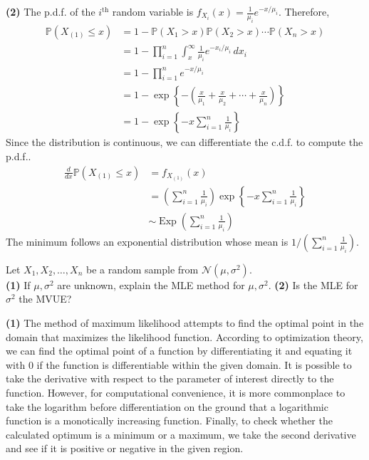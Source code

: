 \documentclass[answers]{exam}
\newcommand{\opn}{\operatorname}
\begin{document}
\begin{questions}
\begin{solution}
   \textbf{(2)} The p.d.f. of the $i^{\text{th}}$ random variable is $f_{X_{i}}\left(x\right) = \frac{1}{\mu_{i}}e^{-x/\mu_{i}}$. Therefore,
   \begin{align*}
      \mathbb{P}\left(X_{\left(1\right)}\leq x\right) &= 1-\mathbb{P}\left(X_{1}>x\right)\mathbb{P}\left(X_{2}>x\right)\cdots \mathbb{P}\left(X_{n}>x\right)\\
      &= 1-\prod_{i=1}^{n}\int_{x}^{\infty}\frac{1}{\mu_{i}}e^{-x_{i}/\mu_{i}}\,dx_{i}\\
      &= 1-\prod_{i=1}^{n} e^{-x/\mu_{i}}\\
      &= 1-\exp\left\{-\left(\frac{x}{\mu_{1}}+\frac{x}{\mu_{2}} + \cdots + \frac{x}{\mu_{n}} \right)\right\}\\
      &= 1 - \exp\left\{-x\sum_{i=1}^{n}\frac{1}{\mu_{i}}\right\}
   \end{align*}
   Since the distribution is continuous, we can differentiate the c.d.f. to compute the p.d.f..
   \begin{align*}
      \frac{d}{dx}\mathbb{P}\left(X_{\left(1\right)}\leq x \right) &= f_{X_{\left(1\right)}}\left(x\right)\\
      &= \left(\sum_{i=1}^{n} \frac{1}{\mu_{i}}\right) \exp \left\{-x\sum_{i=1}^{n}\frac{1}{\mu_{i}} \right\}\\
      &\sim \opn{Exp}\left(\sum_{i=1}^{n}\frac{1}{\mu_{i}} \right)
   \end{align*}
   The minimum follows an exponential distribution whose mean is $1/\left(\sum_{i=1}^{n}\frac{1}{\mu_{i}} \right)$.
\end{solution}
   \question
   Let $X_{1}, X_{2}, \ldots , X_{n}$ be a random sample from $\mathcal{N}\left(\mu, \sigma^{2}\right)$.\\
   \textbf{(1)} If $\mu, \sigma^{2}$ are unknown, explain the MLE method for $\mu, \sigma^{2}$.
   \textbf{(2)} Is the MLE for $\sigma^{2}$ the MVUE?
   \begin{solution}
      \textbf{(1)} The method of maximum likelihood attempts to find the optimal point in the domain that maximizes the likelihood function. According to optimization theory, we can find the optimal point of a function by differentiating it and equating it with 0 if the function is differentiable within the given domain. It is possible to take the derivative with respect to the parameter of interest directly to the function. However, for computational convenience, it is more commonplace to take the logarithm before differentiation on the ground that a logarithmic function is a monotically increasing function. Finally, to check whether the calculated optimum is a minimum or a maximum, we take the second derivative and see if it is positive or negative in the given region.\par

\end{solution}
\end{questions}
\end{document}
